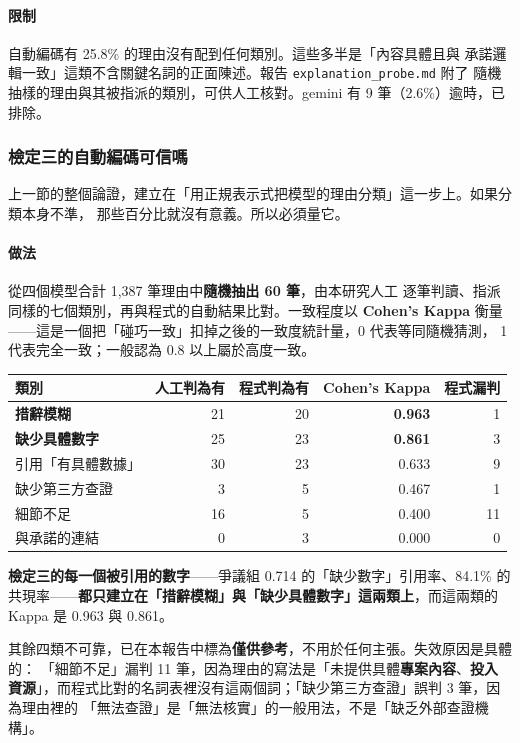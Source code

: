 \documentclass[11pt,a4paper]{ctexart}
\begin{document}
\paragraph{限制} 自動編碼有 25.8\% 的理由沒有配到任何類別。這些多半是「內容具體且與
承諾邏輯一致」這類不含關鍵名詞的正面陳述。報告 \texttt{explanation\_probe.md} 附了
隨機抽樣的理由與其被指派的類別，可供人工核對。gemini 有 9 筆（2.6\%）逾時，已排除。

\subsubsection{檢定三的自動編碼可信嗎}
\label{sec:coder}

上一節的整個論證，建立在「用正規表示式把模型的理由分類」這一步上。如果分類本身不準，
那些百分比就沒有意義。所以必須量它。

\paragraph{做法} 從四個模型合計 1{,}387 筆理由中\textbf{隨機抽出 60 筆}，由本研究人工
逐筆判讀、指派同樣的七個類別，再與程式的自動結果比對。一致程度以 \textbf{Cohen's
Kappa} 衡量——這是一個把「碰巧一致」扣掉之後的一致度統計量，0 代表等同隨機猜測，
1 代表完全一致；一般認為 0.8 以上屬於高度一致。

\begin{table}[h]
\centering\small
\begin{tabular}{@{}lrrrr@{}}
\toprule
類別 & 人工判為有 & 程式判為有 & Cohen's Kappa & 程式漏判 \\
\midrule
\rowcolor{green!12}
\textbf{措辭模糊} & 21 & 20 & \textbf{0.963} & 1 \\
\rowcolor{green!12}
\textbf{缺少具體數字} & 25 & 23 & \textbf{0.861} & 3 \\
\midrule
引用「有具體數據」 & 30 & 23 & 0.633 & 9 \\
缺少第三方查證 & 3 & 5 & 0.467 & 1 \\
細節不足 & 16 & 5 & 0.400 & 11 \\
與承諾的連結 & 0 & 3 & 0.000 & 0 \\
\bottomrule
\end{tabular}
\end{table}

\begin{tcolorbox}[colback=green!5, colframe=green!45, title=撐起論證的那兩類站得住，其餘的不行]
\textbf{檢定三的每一個被引用的數字}——爭議組 0.714 的「缺少數字」引用率、84.1\% 的
共現率——\textbf{都只建立在「措辭模糊」與「缺少具體數字」這兩類上}，而這兩類的 Kappa
是 0.963 與 0.861。

\medskip
其餘四類不可靠，已在本報告中標為\textbf{僅供參考}，不用於任何主張。失效原因是具體的：
「細節不足」漏判 11 筆，因為理由的寫法是「未提供具體\textbf{專案內容}、\textbf{投入
資源}」，而程式比對的名詞表裡沒有這兩個詞；「缺少第三方查證」誤判 3 筆，因為理由裡的
「無法查證」是「無法核實」的一般用法，不是「缺乏外部查證機構」。
\end{tcolorbox}
\end{document}

